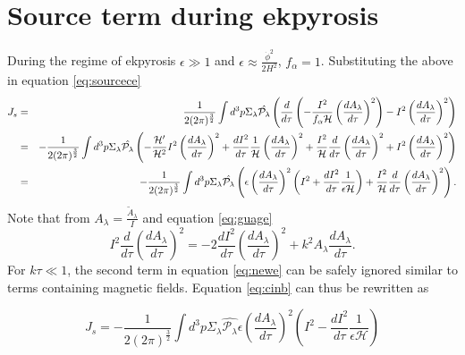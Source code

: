 \documentclass[12pt,a4paper]{article}
\newcommand{\be}{\begin{equation}}
\newcommand{\ee}{\end{equation}}
\numberwithin{equation}{section}
\numberwithin{equation}{section}
\begin{document}
\section{Source term during ekpyrosis} \label{app:C}
During the regime of ekpyrosis $\epsilon \gg 1$ and $\epsilon \approx \frac{\dot{\phi}^2}{2 H^2}$, $f_{\alpha}=1$. Substituting the above in equation \eqref{eq:sourcece} 
\begin{eqnarray}
    J_s &=& \frac{1}{2 (2\pi)^\frac{3}{2}}\int d^3p \Sigma_{\lambda}\hat{\mathcal{P_{\lambda}}}\left( \dfrac{d}{d\tau} \left(-\frac{I^2}{f_{\alpha}\mathcal{H}} \left( \dfrac{d A_{\lambda}}{d\tau} \right)^2 \right) -  I^2 \left( \dfrac{d A_{\lambda}}{d\tau} \right)^2\right)\cr
      &=&  -\frac{1}{2 (2\pi)^\frac{3}{2}}\int d^3p \Sigma_{\lambda}  \hat{\mathcal{P_{\lambda}}} \left(   -\frac{\mathcal{H}'}{\mathcal{H}^2}I^2\left(\dfrac{d A_{\lambda}}{d\tau}\right)^2+ \dfrac{d I^2}{d\tau} \frac{1}{\mathcal{H}}  \left(\dfrac{d A_{\lambda}}{d\tau}\right)^2 + \frac{I^2}{\mathcal{H}}\dfrac{d}{d\tau}\left(\dfrac{d A_{\lambda}}{d\tau}\right)^2 +   I^2 \left(\dfrac{d A_{\lambda}}{d\tau}\right)^2\right)  \cr
      &=& - \frac{1}{2 (2\pi)^\frac{3}{2}}\int d^3p\Sigma_{\lambda}  \hat{\mathcal{P_{\lambda}}} \left(\epsilon\left(\dfrac{d A_{\lambda}}{d\tau}\right)^2\left( I^2+ \dfrac{d I^2}{d\tau} \frac{1}{\mathcal{\epsilon H}}   \right) + \frac{I^2}{\mathcal{H}}\dfrac{d}{d\tau}\left(\dfrac{d A_{\lambda}}{d\tau}\right)^2\right).
     \label{eq:cinb}
\end{eqnarray}
Note that from $A_{\lambda}=\frac{\tilde{A}_{\lambda}}{I}$ and equation \eqref{eq:guage}
\begin{equation}
    I^2\dfrac{d}{d\tau} \left(\dfrac{d A_{\lambda}}{d\tau}\right)^2 =  -2\dfrac{d I^2}{d\tau} \left(\dfrac{d A_{\lambda}}{d\tau}\right)^2 + k^2 A_{\lambda}\dfrac{d A_{\lambda}}{d\tau}.
    \label{eq:newe}
\end{equation}
For $k\tau\ll1$, the second term in equation \eqref{eq:newe} can be safely ignored similar to terms containing  magnetic fields. Equation \eqref{eq:cinb} can thus be rewritten as

\be
J_s=- \frac{1}{2 (2\pi)^\frac{3}{2}}\int d^3p\Sigma_{\lambda}\hat{\mathcal{P_{\lambda}}}\epsilon\left(\dfrac{d A_{\lambda}}{d\tau}\right)^2\left( I^2- \dfrac{d I^2}{d\tau} \frac{1}{\mathcal{\epsilon H}}   \right) 
\ee
\end{document}
